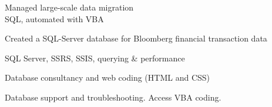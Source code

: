 \documentclass[a4paper,nomath]{deedy-resume} %
\begin{document}
\begin{paracol}{2}


    \begin{tightitemize}
        \item Managed large-scale data migration \\
        SQL, automated with VBA
        \item Created a SQL-Server database for Bloomberg financial transaction data
    \end{tightitemize}

    \sectionspace %



    \begin{tightitemize}
        \item SQL Server, SSRS, SSIS, querying \& performance
    \end{tightitemize}

    \sectionspace %
    


    \begin{tightitemize}
        \item Database consultancy and web coding (HTML and CSS)
    \end{tightitemize}

    \sectionspace %
    


    \begin{tightitemize}
        \item Database support and troubleshooting. Access VBA coding.
    \end{tightitemize}


\end{paracol}
\end{document}
